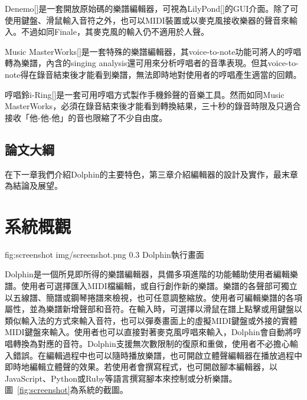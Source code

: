 \documentclass[12pt,a4paper,oneside]{report}
\begin{document}
Denemo[]是一套開放原始碼的樂譜編輯器，可視為LilyPond[]的GUI介面。除了可使用鍵盤、滑鼠輸入音符之外，也可以MIDI裝置或以麥克風接收樂器的聲音來輸入。不過如同Finale，其麥克風的輸入仍不適用於人聲。

Music MasterWorks[]是一套特殊的樂譜編輯器，其voice-to-note功能可將人的哼唱轉為樂譜，內含的singing analysis還可用來分析哼唱者的音準表現。但其voice-to-note得在錄音結束後才能看到樂譜，無法即時地對使用者的哼唱產生適當的回饋。

哼唱鈴i-Ring[]是一套可用哼唱方式製作手機鈴聲的音樂工具。然而如同Music MasterWorks，必須在錄音結束後才能看到轉換結果，三十秒的錄音時限及只適合接收「他-他-他」的音也限縮了不少自由度。

\section{論文大綱} %

在下一章我們介紹Dolphin的主要特色，第三章介紹編輯器的設計及實作，最末章為結論及展望。

\chapter{系統概觀} %


\figurewithcaption
{fig:screenshot}
{img/screenshot.png}
{0.3}
{Dolphin執行畫面}

Dolphin是一個所見即所得的樂譜編輯器，具備多項進階的功能輔助使用者編輯樂譜。使用者可選擇匯入MIDI檔編輯，或自行創作新的樂譜。樂譜的各聲部可獨立以五線譜、簡譜或鋼琴捲譜來檢視，也可任意調整縮放。使用者可編輯樂譜的各項屬性，並為樂譜新增聲部和音符。在輸入時，可選擇以滑鼠在譜上點擊或用鍵盤以類似輸入法的方式來輸入音符，也可以彈奏畫面上的虛擬MIDI鍵盤或外接的實體MIDI鍵盤來輸入。使用者也可以直接對著麥克風哼唱來輸入，Dolphin會自動將哼唱轉換為對應的音符。Dolphin支援無次數限制的復原和重做，使用者不必擔心輸入錯誤。在編輯過程中也可以隨時播放樂譜，也可開啟立體聲編輯器在播放過程中即時地編輯立體聲的效果。若使用者會撰寫程式，也可開啟腳本編輯器，以JavaScript、Python或Ruby等語言撰寫腳本來控制或分析樂譜。圖~\ref{fig:screenshot}為系統的截圖。
\end{document}

